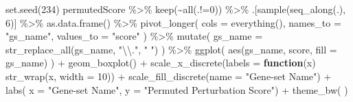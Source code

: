 \documentclass[9pt,a4paper,]{extarticle}
\newenvironment{Shaded}{\begin{snugshade}}{\end{snugshade}}
\newcommand{\AttributeTok}[1]{\textcolor[rgb]{0.77,0.63,0.00}{#1}}
\newcommand{\ControlFlowTok}[1]{\textcolor[rgb]{0.13,0.29,0.53}{\textbf{#1}}}
\newcommand{\DecValTok}[1]{\textcolor[rgb]{0.00,0.00,0.81}{#1}}
\newcommand{\FunctionTok}[1]{\textcolor[rgb]{0.00,0.00,0.00}{#1}}
\newcommand{\NormalTok}[1]{#1}
\newcommand{\SpecialCharTok}[1]{\textcolor[rgb]{0.00,0.00,0.00}{#1}}
\newcommand{\StringTok}[1]{\textcolor[rgb]{0.31,0.60,0.02}{#1}}
\begin{document}
\begin{Shaded}
\begin{Highlighting}[]
\FunctionTok{set.seed}\NormalTok{(}\DecValTok{234}\NormalTok{)}
\NormalTok{permutedScore }\SpecialCharTok{\%\textgreater{}\%}
    \FunctionTok{keep}\NormalTok{(}\SpecialCharTok{\textasciitilde{}}\FunctionTok{all}\NormalTok{(.}\SpecialCharTok{!=}\DecValTok{0}\NormalTok{)) }\SpecialCharTok{\%\textgreater{}\%}
\NormalTok{    .[}\FunctionTok{sample}\NormalTok{(}\FunctionTok{seq\_along}\NormalTok{(.), }\DecValTok{6}\NormalTok{)] }\SpecialCharTok{\%\textgreater{}\%}
    \FunctionTok{as.data.frame}\NormalTok{() }\SpecialCharTok{\%\textgreater{}\%}
    \FunctionTok{pivot\_longer}\NormalTok{(}
        \AttributeTok{cols =} \FunctionTok{everything}\NormalTok{(), }
        \AttributeTok{names\_to =} \StringTok{"gs\_name"}\NormalTok{, }
        \AttributeTok{values\_to =} \StringTok{"score"}
\NormalTok{    ) }\SpecialCharTok{\%\textgreater{}\%}
    \FunctionTok{mutate}\NormalTok{(}
        \AttributeTok{gs\_name =} \FunctionTok{str\_replace\_all}\NormalTok{(gs\_name, }\StringTok{"}\SpecialCharTok{\textbackslash{}\textbackslash{}}\StringTok{."}\NormalTok{, }\StringTok{" "}\NormalTok{)}
\NormalTok{    ) }\SpecialCharTok{\%\textgreater{}\%}
    \FunctionTok{ggplot}\NormalTok{(}
        \FunctionTok{aes}\NormalTok{(gs\_name, score, }\AttributeTok{fill =}\NormalTok{ gs\_name)}
\NormalTok{    ) }\SpecialCharTok{+}
    \FunctionTok{geom\_boxplot}\NormalTok{() }\SpecialCharTok{+}
    \FunctionTok{scale\_x\_discrete}\NormalTok{(}\AttributeTok{labels =} \ControlFlowTok{function}\NormalTok{(x) }\FunctionTok{str\_wrap}\NormalTok{(x, }\AttributeTok{width =} \DecValTok{10}\NormalTok{)) }\SpecialCharTok{+}
    \FunctionTok{scale\_fill\_discrete}\NormalTok{(}\AttributeTok{name =} \StringTok{"Gene{-}set Name"}\NormalTok{) }\SpecialCharTok{+} 
    \FunctionTok{labs}\NormalTok{(}
        \AttributeTok{x =} \StringTok{"Gene{-}set Name"}\NormalTok{, }
        \AttributeTok{y =} \StringTok{"Permuted Perturbation Score"}\NormalTok{) }\SpecialCharTok{+}
    \FunctionTok{theme\_bw}\NormalTok{(}
\NormalTok{    )}
\end{Highlighting}
\end{Shaded}
\end{document}

